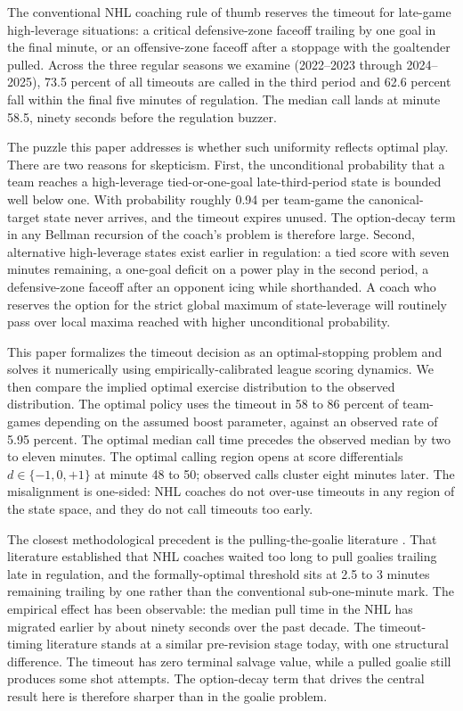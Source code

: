 \documentclass[11pt]{article}
\begin{document}
The conventional NHL coaching rule of thumb reserves the timeout for late-game high-leverage situations: a critical defensive-zone faceoff trailing by one goal in the final minute, or an offensive-zone faceoff after a stoppage with the goaltender pulled. Across the three regular seasons we examine (2022--2023 through 2024--2025), 73.5 percent of all timeouts are called in the third period and 62.6 percent fall within the final five minutes of regulation. The median call lands at minute 58.5, ninety seconds before the regulation buzzer.

The puzzle this paper addresses is whether such uniformity reflects optimal play. There are two reasons for skepticism. First, the unconditional probability that a team reaches a high-leverage tied-or-one-goal late-third-period state is bounded well below one. With probability roughly 0.94 per team-game the canonical-target state never arrives, and the timeout expires unused. The option-decay term in any Bellman recursion of the coach's problem is therefore large. Second, alternative high-leverage states exist earlier in regulation: a tied score with seven minutes remaining, a one-goal deficit on a power play in the second period, a defensive-zone faceoff after an opponent icing while shorthanded. A coach who reserves the option for the strict global maximum of state-leverage will routinely pass over local maxima reached with higher unconditional probability.

This paper formalizes the timeout decision as an optimal-stopping problem and solves it numerically using empirically-calibrated league scoring dynamics. We then compare the implied optimal exercise distribution to the observed distribution. The optimal policy uses the timeout in 58 to 86 percent of team-games depending on the assumed boost parameter, against an observed rate of 5.95 percent. The optimal median call time precedes the observed median by two to eleven minutes. The optimal calling region opens at score differentials $d \in \{-1, 0, +1\}$ at minute 48 to 50; observed calls cluster eight minutes later. The misalignment is one-sided: NHL coaches do not over-use timeouts in any region of the state space, and they do not call timeouts too early.

The closest methodological precedent is the pulling-the-goalie literature \citep{BeaudoinSwartz2010, Asmussen2011}. That literature established that NHL coaches waited too long to pull goalies trailing late in regulation, and the formally-optimal threshold sits at 2.5 to 3 minutes remaining trailing by one rather than the conventional sub-one-minute mark. The empirical effect has been observable: the median pull time in the NHL has migrated earlier by about ninety seconds over the past decade. The timeout-timing literature stands at a similar pre-revision stage today, with one structural difference. The timeout has zero terminal salvage value, while a pulled goalie still produces some shot attempts. The option-decay term that drives the central result here is therefore sharper than in the goalie problem.
\end{document}
